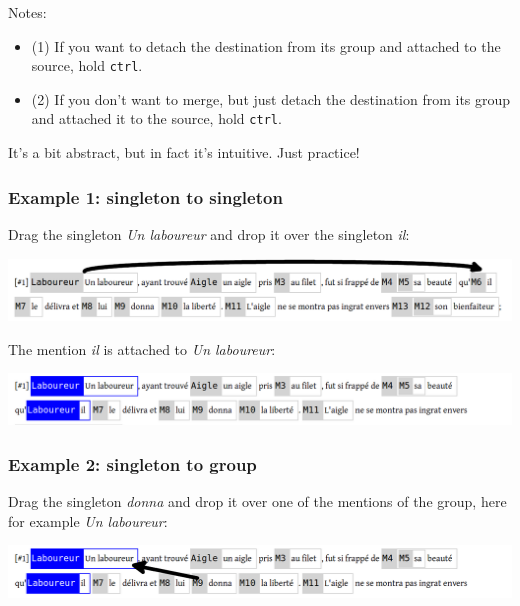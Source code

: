 \documentclass[12pt]{article}
\begin{document}
Notes:
\begin{itemize}
   \item (1) If you want to detach the destination from its group and
   attached to the source, hold \verb|ctrl|.
   \item (2) If you don't want to merge, but just detach the destination from
   its group and attached it to the source, hold \verb|ctrl|.
\end{itemize}

It's a bit abstract, but in fact it's intuitive.  Just practice!


 \subsubsection{Example 1: singleton to singleton}

Drag the singleton \emph{Un laboureur} and drop it over the singleton
\emph{il}:\nopagebreak

\includegraphics[width=17cm]{imgs/dd_example_01_before.png}

The mention \emph{il} is attached to \emph{Un laboureur}:\nopagebreak

\includegraphics[width=17cm]{imgs/dd_example_01_after.png}


 \subsubsection{Example 2: singleton to group}

Drag the singleton \emph{donna} and drop it over one of the mentions of the
group, here for example \emph{Un laboureur}:\nopagebreak

\includegraphics[width=17cm]{imgs/dd_example_02_before2.png}
\end{document}
